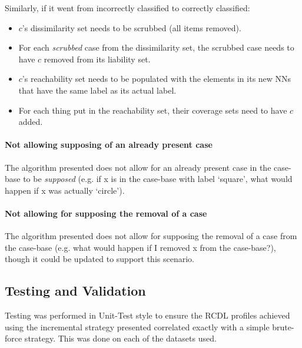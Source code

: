 \documentclass[a4paper,11pt]{report}
\begin{document}
Similarly, if it went from incorrectly classified to correctly classified:
\begin{itemize}
	\item $c$'s dissimilarity set needs to be scrubbed (all items removed).
	\item For each \emph{scrubbed} case from the dissimilarity set, the scrubbed case needs to have $c$ removed from its liability set.
	\item $c$'s reachability set needs to be populated with the elements in its new NNs that have the same label as its actual label.
	\item For each thing put in the reachability set, their coverage sets need to have $c$ added.
\end{itemize}

\paragraph{Not allowing supposing of an already present case}
The algorithm presented does not allow for an already present case in the case-base to be \emph{supposed} (e.g. if x is in the case-base with label `square', what would happen if x was actually `circle').

\paragraph{Not allowing for supposing the removal of a case}
The algorithm presented does not allow for supposing the removal of a case from the case-base (e.g. what would happen if I removed x from the case-base?), though it could be updated to support this scenario.

\subsection{Testing and Validation}
Testing was performed in Unit-Test style to ensure the RCDL profiles achieved using the incremental strategy presented correlated exactly with a simple brute-force strategy. This was done on each of the datasets used.

\vspace{10pt}
\end{document}

